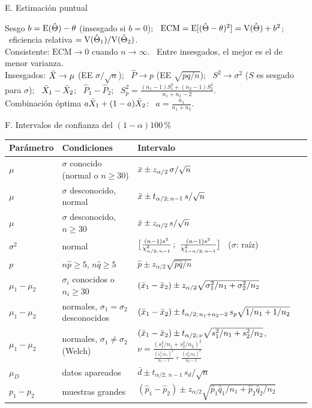 {\begin{hoja}{E. Estimación puntual}
\raggedright
Sesgo $b=\mathrm{E}(\hat\Theta)-\theta$ (insesgado si $b=0$); \ $\mathrm{ECM}=\mathrm{E}[(\hat\Theta-\theta)^2]=\mathrm{V}(\hat\Theta)+b^2$; \ eficiencia relativa $=\mathrm{V}(\hat\Theta_1)/\mathrm{V}(\hat\Theta_2)$.\\
Consistente: $\mathrm{ECM}\to0$ cuando $n\to\infty$. \ Entre insesgados, el mejor es el de menor varianza.\\
Insesgados: $\bar{X}\to\mu$ (EE $\sigma/\sqrt n$); \ $\hat P\to p$ (EE $\sqrt{pq/n}$); \ $S^2\to\sigma^2$ ($S$ es sesgado para $\sigma$); \ $\bar{X}_1-\bar{X}_2$; \ $\hat P_1-\hat P_2$; \ $S_p^2=\frac{(n_1-1)S_1^2+(n_2-1)S_2^2}{n_1+n_2-2}$.\\
Combinación óptima $a\bar{X}_1+(1-a)\bar{X}_2$: \ $a=\frac{n_1}{n_1+n_2}$.
\end{hoja}

\begin{hoja}{F. Intervalos de confianza del $(1-\alpha)100\,\%$}
\renewcommand{\arraystretch}{1.55}
\begin{tabular}{@{}>{\raggedright\arraybackslash}p{1.6cm}>{\raggedright\arraybackslash}p{4.6cm}l@{}}
\toprule
Parámetro & Condiciones & Intervalo\\\midrule
$\mu$ & $\sigma$ conocido (normal o $n\ge30$) & $\bar{x}\pm z_{\alpha/2}\,\sigma/\sqrt n$\\
$\mu$ & $\sigma$ desconocido, normal & $\bar{x}\pm t_{\alpha/2;\,n-1}\,s/\sqrt n$\\
$\mu$ & $\sigma$ desconocido, $n\ge30$ & $\bar{x}\pm z_{\alpha/2}\,s/\sqrt n$\\
$\sigma^2$ & normal & $\big[\frac{(n-1)s^2}{\chis_{\alpha/2;\,n-1}}\,;\ \frac{(n-1)s^2}{\chis_{1-\alpha/2;\,n-1}}\big]$ \ ($\sigma$: raíz)\\
$p$ & $n\hat p\ge5$, $n\hat q\ge5$ & $\hat p\pm z_{\alpha/2}\sqrt{\hat p\hat q/n}$\\
$\mu_1-\mu_2$ & $\sigma_i$ conocidos o $n_i\ge30$ & $(\bar{x}_1-\bar{x}_2)\pm z_{\alpha/2}\sqrt{\sigma_1^2/n_1+\sigma_2^2/n_2}$\\
$\mu_1-\mu_2$ & normales, $\sigma_1=\sigma_2$ desconocidos & $(\bar{x}_1-\bar{x}_2)\pm t_{\alpha/2;\,n_1+n_2-2}\,s_p\sqrt{1/n_1+1/n_2}$\\
$\mu_1-\mu_2$ & normales, $\sigma_1\neq\sigma_2$ (Welch) & $(\bar{x}_1-\bar{x}_2)\pm t_{\alpha/2;\,\nu}\sqrt{s_1^2/n_1+s_2^2/n_2}$, \ $\nu=\frac{(s_1^2/n_1+s_2^2/n_2)^2}{\frac{(s_1^2/n_1)^2}{n_1-1}+\frac{(s_2^2/n_2)^2}{n_2-1}}$\\
$\mu_D$ & datos apareados & $\bar d\pm t_{\alpha/2;\,n-1}\,s_d/\sqrt n$\\
$p_1-p_2$ & muestras grandes & $(\hat p_1-\hat p_2)\pm z_{\alpha/2}\sqrt{\hat p_1\hat q_1/n_1+\hat p_2\hat q_2/n_2}$\\
\bottomrule
\end{tabular}


\end{hoja}}
